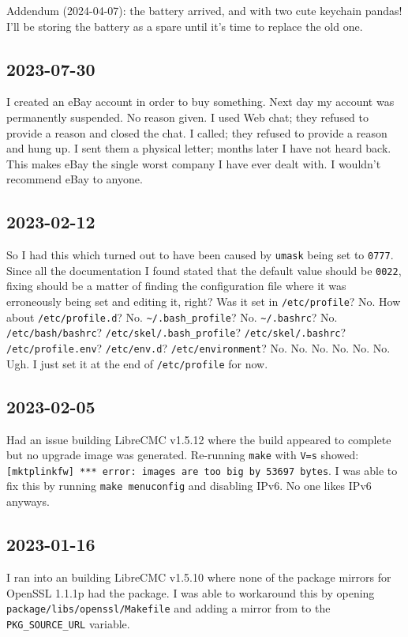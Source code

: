 \documentclass{article}
\begin{document}
Addendum (2024-04-07): the battery arrived, and with two cute keychain pandas!  I'll be storing the battery as a spare until it's time to replace the old one.

\subsection{2023-07-30}
I created an eBay account in order to buy something.
Next day my account was permanently suspended.
No reason given.
I used Web chat; they refused to provide a reason and closed the chat.
I called; they refused to provide a reason and hung up.
I sent them a physical letter; months later I have not heard back.
This makes eBay the single worst company I have ever dealt with.
I wouldn't recommend eBay to anyone.

\subsection{2023-02-12}
So I had this  which turned out to have been caused by \texttt{umask} being set to \texttt{0777}.  Since all the documentation I found stated that the default value should be \texttt{0022}, fixing should be a matter of finding the configuration file where it was erroneously being set and editing it, right?  Was it set in \texttt{/etc/profile}?  No.  How about \texttt{/etc/profile.d}?  No.  \texttt{\textasciitilde /.bash_profile}?  No.  \texttt{\textasciitilde /.bashrc}?  No.  \texttt{/etc/bash/bashrc}?  \texttt{/etc/skel/.bash_profile}?  \texttt{/etc/skel/.bashrc}?  \texttt{/etc/profile.env}?  \texttt{/etc/env.d}?  \texttt{/etc/environment}?  No.  No.  No.  No.  No.  No.  Ugh.  I just set it at the end of \texttt{/etc/profile} for now.

\subsection{2023-02-05}
Had an issue building LibreCMC v1.5.12 where the build appeared to complete but no upgrade image was generated.  Re-running \texttt{make} with \texttt{V=s} showed: \texttt{[mktplinkfw] *** error: images are too big by 53697 bytes}.  I was able to fix this by running \texttt{make menuconfig} and disabling IPv6.  No one likes IPv6 anyways.

\subsection{2023-01-16}
I ran into an  building LibreCMC v1.5.10 where none of the package mirrors for OpenSSL 1.1.1p had the package.  I was able to workaround this by opening \texttt{package/libs/openssl/Makefile} and adding a mirror from  to the \texttt{PKG_SOURCE_URL} variable.
\end{document}

